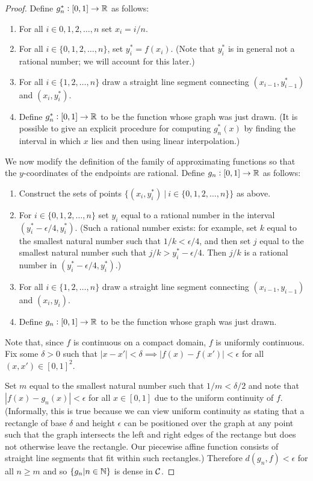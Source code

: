 \begin{enumerate}
\begin{proof}
    Define $g^*_n: [0, 1] \to \mathbb{R}$ as follows:
    \begin{enumerate}
    \item For all $i \in 0, 1, 2, \ldots, n$ set $x_i = i/n$.
    \item For all $i \in \{0, 1, 2, \ldots, n\}$, set $y^*_i = f(x_i)$. (Note that $y^*_i$ is in general not a rational
      number; we will account for this later.)
    \item For all $i \in \{1, 2, \ldots, n\}$ draw a straight line segment connecting $(x_{i-1}, y^*_{i-1})$
      and $(x_i, y^*_i)$.
    \item Define $g^*_n: [0, 1] \to \mathbb{R}$ to be the function whose graph was just drawn. (It is possible to give an
      explicit procedure for computing $g^*_n(x)$ by finding the interval in which $x$ lies and then using linear
      interpolation.)
    \end{enumerate}

    We now modify the definition of the family of approximating functions so that the $y$-coordinates of the
    endpoints are rational. Define $g_n: [0, 1] \to \mathbb{R}$ as follows:
    \begin{enumerate}
    \item Construct the sets of points $\{(x_i, y^*_i) ~|~ i \in \{0, 1, 2, \ldots, n\}\}$ as above.
    \item For $i \in \{0, 1, 2, \ldots, n\}$ set $y_i$ equal to a rational number in the
      interval $(y^*_i - \epsilon/4, y^*_i)$. (Such a rational number exists: for example, set $k$ equal to the
      smallest natural number such that $1/k < \epsilon/4$, and then set $j$ equal to the smallest natural number
      such that $j/k > y^*_i - \epsilon/4$. Then $j/k$ is a rational number in $(y^*_i - \epsilon/4, y^*_i)$.)
    \item For all $i \in \{1, 2, \ldots, n\}$ draw a straight line segment connecting $(x_{i-1}, y_{i-1})$
      and $(x_i, y_i)$.
    \item Define $g_n: [0, 1] \to \mathbb{R}$ to be the function whose graph was just drawn.
    \end{enumerate}
    Note that, since $f$ is continuous on a compact domain, $f$ is uniformly continuous. Fix some $\delta > 0$ such
    that $|x - x'| < \delta \implies |f(x) - f(x')| < \epsilon$ for all $(x, x') \in [0, 1]^2$.

    Set $m$ equal to the smallest natural number such that $1/m < \delta/2$ and note
    that $|f(x) - g_n(x)| < \epsilon$ for all $x \in [0, 1]$ due to the uniform continuity of $f$. (Informally,
    this is true because we can view uniform continuity as stating that a rectangle of base $\delta$ and
    height $\epsilon$ can be positioned over the graph at any point such that the graph intersects the left and
    right edges of the rectange but does not otherwise leave the rectangle. Our piecewise affine function
    consists of straight line segments that fit within such rectangles.) Therefore $d(g_n, f) < \epsilon$ for
    all $n \geq m$ and so $\{g_n | n \in \mathbb{N}\}$ is dense in $\mathcal C$.


\end{proof}
\end{enumerate}
